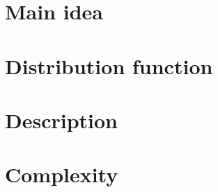 \section{Main idea}
	
	
\section{Distribution function}
	
	
\section{Description}
	

\section{Complexity}
	